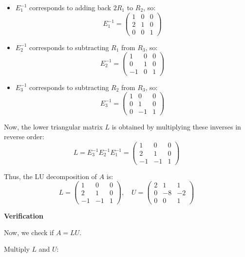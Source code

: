 \documentclass[
  letterpaper,
  DIV=11,
  numbers=noendperiod]{scrreprt}
\theoremstyle{plain}
\theoremstyle{definition}
\theoremstyle{remark}
\begin{document}
\begin{itemize}
\item
  \(E_1^{-1}\) corresponds to adding back \(2R_1\) to \(R_2\), so: \[
  E_1^{-1} = \begin{pmatrix}
  1 & 0 & 0 \\
  2 & 1 & 0 \\
  0 & 0 & 1
  \end{pmatrix}
  \]
\item
  \(E_2^{-1}\) corresponds to subtracting \(R_1\) from \(R_3\), so: \[
  E_2^{-1} = \begin{pmatrix}
  1 & 0 & 0 \\
  0 & 1 & 0 \\
  -1 & 0 & 1
  \end{pmatrix}
  \]
\item
  \(E_3^{-1}\) corresponds to subtracting \(R_2\) from \(R_3\), so: \[
  E_3^{-1} = \begin{pmatrix}
  1 & 0 & 0 \\
  0 & 1 & 0 \\
  0 & -1 & 1
  \end{pmatrix}
  \]
\end{itemize}

Now, the lower triangular matrix \(L\) is obtained by multiplying these
inverses in reverse order: \[
L = E_3^{-1} E_2^{-1} E_1^{-1} = \begin{pmatrix}
1 & 0 & 0 \\
2 & 1 & 0 \\
-1 & -1 & 1
\end{pmatrix}
\]

Thus, the LU decomposition of \(A\) is: \[
L = \begin{pmatrix}
1 & 0 & 0 \\
2 & 1 & 0 \\
-1 & -1 & 1
\end{pmatrix}, 
\quad U = \begin{pmatrix} 
2 & 1 & 1 \\
0 & -8 & -2 \\
0 & 0 & 1 
\end{pmatrix}
\]

\textbf{Verification}

Now, we check if \(A = LU\).

Multiply \(L\) and \(U\):
\end{document}
